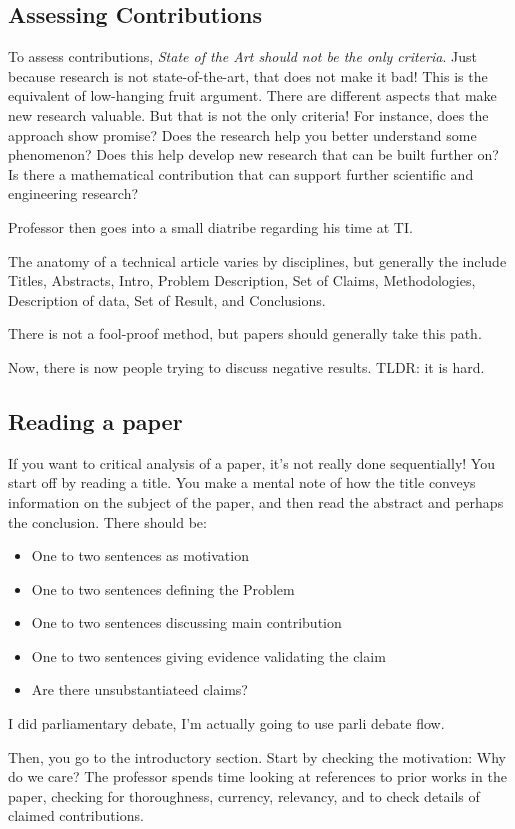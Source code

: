 \documentclass[10pt, oneside]{article}
\begin{document}
\subsection{Assessing Contributions}
To assess contributions, \textit{State of the Art should not be the only criteria}. Just because research is not state-of-the-art, that does not make it bad! This is the equivalent of low-hanging fruit argument. There are different aspects that make new research valuable. But that is not the only criteria! For instance, does the approach show promise? Does the research help you better understand some phenomenon? Does this help develop new research that can be built further on? Is there a mathematical contribution that can support further scientific and engineering research?

Professor then goes into a small diatribe regarding his time at TI. 

The anatomy of a technical article varies by disciplines, but generally the include Titles, Abstracts, Intro, Problem Description, Set of Claims, Methodologies, Description of data, Set of Result, and Conclusions. 

There is not a fool-proof method, but papers should generally take this path. 

Now, there is now people trying to discuss negative results. TLDR: it is hard.
\subsection{Reading a paper}
If you want to critical analysis of a paper, it's not really done sequentially! You start off by reading a title. You make a mental note of how the title conveys information on the subject of the paper, and then read the abstract and perhaps the conclusion. There should be:
\begin{itemize}
    \item One to two sentences as motivation
    \item One to two sentences defining the Problem
    \item One to two sentences discussing main contribution
    \item One to two sentences giving evidence validating the claim
    \item Are there unsubstantiateed claims?
\end{itemize}
I did parliamentary debate, I'm actually going to use parli debate flow. 

Then, you go to the introductory section. Start by checking the motivation: Why do we care? The professor spends time looking at references to prior works in the paper, checking for thoroughness, currency, relevancy, and to check details of claimed contributions. 
\end{document}
